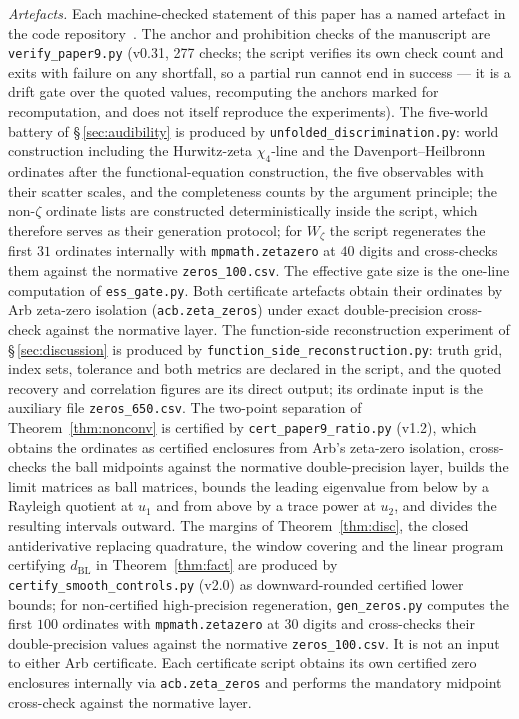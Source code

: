 \documentclass[11pt]{article}
\newcommand{\dBL}{d_{\mathrm{BL}}}              %
\begin{document}
\emph{Artefacts.} Each machine-checked statement of this paper has a named
artefact in the code repository~\cite{Code}. The anchor and prohibition checks
of the manuscript are \texttt{verify\_paper9.py} (v0.31, 277 checks;
the script verifies its own check count and exits with failure on any
shortfall, so a partial run cannot end in success --- it is a drift gate over
the quoted values, recomputing the anchors marked for recomputation, and does
not itself reproduce the experiments). The five-world battery of
\S\,\ref{sec:audibility} is produced by \texttt{unfolded\_discrimination.py}:
world construction including the Hurwitz-zeta $\chi_4$-line and the
Davenport--Heilbronn ordinates after the functional-equation construction,
the five observables with their scatter scales, and the completeness counts
by the argument principle; the non-$\zeta$ ordinate lists are constructed
deterministically inside the script, which therefore serves as their
generation protocol; for $W_\zeta$ the script regenerates the first $31$
ordinates internally with \texttt{mpmath.zetazero} at $40$ digits and
cross-checks them against the normative \texttt{zeros\_100.csv}. The effective gate
size is the one-line computation of \texttt{ess\_gate.py}. Both
certificate artefacts obtain their ordinates by Arb zeta-zero isolation
(\texttt{acb.zeta\_zeros}) under exact double-precision cross-check
against the normative layer. The function-side reconstruction experiment of \S\,\ref{sec:discussion} is
produced by \texttt{function\_side\_reconstruction.py}: truth grid, index sets, tolerance and
both metrics are declared in the script, and the quoted recovery and
correlation figures are its direct output; its ordinate input is the
auxiliary file \texttt{zeros\_650.csv}. The two-point separation of
Theorem~\ref{thm:nonconv} is certified by \texttt{cert\_paper9\_ratio.py}
(v1.2), which obtains the ordinates as certified enclosures from Arb's
zeta-zero isolation, cross-checks the ball midpoints against the normative
double-precision layer, builds the limit matrices as ball matrices, bounds the
leading eigenvalue from below by a Rayleigh quotient at $u_1$ and from above
by a trace power at $u_2$, and divides the resulting intervals outward. The margins of Theorem~\ref{thm:disc}, the closed
antiderivative replacing quadrature, the window covering and the linear
program certifying $\dBL$ in Theorem~\ref{thm:fact} are produced by
\texttt{certify\_smooth\_controls.py} (v2.0) as downward-rounded certified lower bounds;
for non-certified high-precision regeneration,
\texttt{gen\_zeros.py} computes the first $100$ ordinates with
\texttt{mpmath.zetazero} at $30$ digits and cross-checks their
double-precision values against the normative \texttt{zeros\_100.csv}. It
is not an input to either Arb certificate. Each certificate script obtains
its own certified zero enclosures internally via \texttt{acb.zeta\_zeros}
and performs the mandatory midpoint cross-check against the normative
layer.
\end{document}
